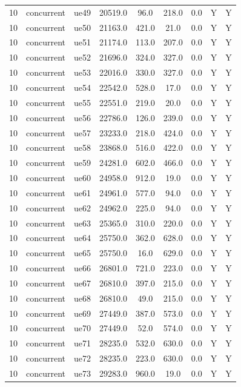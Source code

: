 \begin{table}[ht]
\begin{tabular}{|c|c|c|c|c|c|c|c|c|}
10 & concurrent & ue49 & 20519.0 & 96.0 & 218.0 & 0.0 & Y & Y \\
10 & concurrent & ue50 & 21163.0 & 421.0 & 21.0 & 0.0 & Y & Y \\
10 & concurrent & ue51 & 21174.0 & 113.0 & 207.0 & 0.0 & Y & Y \\
10 & concurrent & ue52 & 21696.0 & 324.0 & 327.0 & 0.0 & Y & Y \\
10 & concurrent & ue53 & 22016.0 & 330.0 & 327.0 & 0.0 & Y & Y \\
10 & concurrent & ue54 & 22542.0 & 528.0 & 17.0 & 0.0 & Y & Y \\
10 & concurrent & ue55 & 22551.0 & 219.0 & 20.0 & 0.0 & Y & Y \\
10 & concurrent & ue56 & 22786.0 & 126.0 & 239.0 & 0.0 & Y & Y \\
10 & concurrent & ue57 & 23233.0 & 218.0 & 424.0 & 0.0 & Y & Y \\
10 & concurrent & ue58 & 23868.0 & 516.0 & 422.0 & 0.0 & Y & Y \\
10 & concurrent & ue59 & 24281.0 & 602.0 & 466.0 & 0.0 & Y & Y \\
10 & concurrent & ue60 & 24958.0 & 912.0 & 19.0 & 0.0 & Y & Y \\
10 & concurrent & ue61 & 24961.0 & 577.0 & 94.0 & 0.0 & Y & Y \\
10 & concurrent & ue62 & 24962.0 & 225.0 & 94.0 & 0.0 & Y & Y \\
10 & concurrent & ue63 & 25365.0 & 310.0 & 220.0 & 0.0 & Y & Y \\
10 & concurrent & ue64 & 25750.0 & 362.0 & 628.0 & 0.0 & Y & Y \\
10 & concurrent & ue65 & 25750.0 & 16.0 & 629.0 & 0.0 & Y & Y \\
10 & concurrent & ue66 & 26801.0 & 721.0 & 223.0 & 0.0 & Y & Y \\
10 & concurrent & ue67 & 26810.0 & 397.0 & 215.0 & 0.0 & Y & Y \\
10 & concurrent & ue68 & 26810.0 & 49.0 & 215.0 & 0.0 & Y & Y \\
10 & concurrent & ue69 & 27449.0 & 387.0 & 573.0 & 0.0 & Y & Y \\
10 & concurrent & ue70 & 27449.0 & 52.0 & 574.0 & 0.0 & Y & Y \\
10 & concurrent & ue71 & 28235.0 & 532.0 & 630.0 & 0.0 & Y & Y \\
10 & concurrent & ue72 & 28235.0 & 223.0 & 630.0 & 0.0 & Y & Y \\
10 & concurrent & ue73 & 29283.0 & 960.0 & 19.0 & 0.0 & Y & Y \\

\end{tabular}
\end{table}
